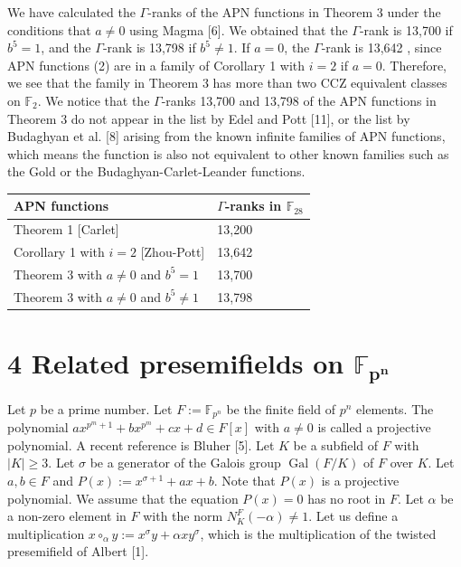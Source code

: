 \documentclass[10pt]{article}
\begin{document}
We have calculated the $\Gamma$-ranks of the APN functions in Theorem 3 under the conditions that $a \neq 0$ using Magma [6]. We obtained that the $\Gamma$-rank is 13,700 if $b^{5}=1$, and the $\Gamma$-rank is 13,798 if $b^{5} \neq 1$. If $a=0$, the $\Gamma$-rank is 13,642 , since APN functions (2) are in a family of Corollary 1 with $i=2$ if $a=0$. Therefore, we see that the family in Theorem 3 has more than two CCZ equivalent classes on $\mathbb{F}_{2}$. We notice that the $\Gamma$-ranks 13,700 and 13,798 of the APN functions in Theorem 3 do not appear in the list by Edel and Pott [11], or the list by Budaghyan et al. [8] arising from the known infinite families of APN functions, which means the function is also not equivalent to other known families such as the Gold or the Budaghyan-Carlet-Leander functions.

\begin{center}
\begin{tabular}{|l|l|}
\hline
APN functions & $\Gamma$-ranks in $\mathbb{F}_{28}$ \\
\hline
Theorem 1 [Carlet] & 13,200 \\
\hline
Corollary 1 with $i=2$ [Zhou-Pott] & 13,642 \\
\hline
Theorem 3 with $a \neq 0$ and $b^{5}=1$ & 13,700 \\
\hline
Theorem 3 with $a \neq 0$ and $b^{5} \neq 1$ & 13,798 \\
\hline
\end{tabular}
\end{center}

\section*{4 Related presemifields on $\mathbb{F}_{\boldsymbol{p}^{\boldsymbol{n}}}$}
Let $p$ be a prime number. Let $F:=\mathbb{F}_{p^{n}}$ be the finite field of $p^{n}$ elements. The polynomial $a x^{p^{m}+1}+b x^{p^{m}}+c x+d \in F[x]$ with $a \neq 0$ is called a projective polynomial. A recent reference is Bluher [5]. Let $K$ be a subfield of $F$ with $|K| \geq 3$. Let $\sigma$ be a generator of the Galois group $\operatorname{Gal}(F / K)$ of $F$ over $K$. Let $a, b \in F$ and $P(x):=x^{\sigma+1}+a x+b$. Note that $P(x)$ is a projective polynomial. We assume that the equation $P(x)=0$ has no root in $F$. Let $\alpha$ be a non-zero element in $F$ with the norm $N_{K}^{F}(-\alpha) \neq 1$. Let us define a multiplication $x \circ_{\alpha} y:=x^{\sigma} y+\alpha x y^{\sigma}$, which is the multiplication of the twisted presemifield of Albert [1].
\end{document}
